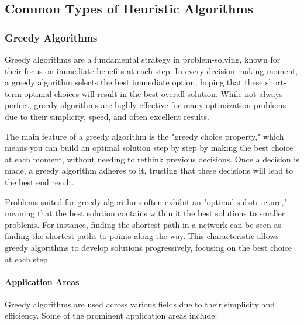 \documentclass[
]{article}
\begin{document}
    \hypertarget{common-types-of-heuristic-algorithms}{%

        \subsection{Common Types of Heuristic Algorithms}\label{itm:common-types-of-heuristic-algorithms}}

    \subsubsection{Greedy Algorithms}
    \label{subsubsec:greedy_algorithms}

    Greedy algorithms are a fundamental strategy in problem-solving, known for their focus on immediate benefits at each step. In every decision-making moment, a greedy algorithm selects the best immediate option, hoping that these short-term optimal choices will result in the best overall solution. While not always perfect, greedy algorithms are highly effective for many optimization problems due to their simplicity, speed, and often excellent results.

    The main feature of a greedy algorithm is the "greedy choice property," which means you can build an optimal solution step by step by making the best choice at each moment, without needing to rethink previous decisions. Once a decision is made, a greedy algorithm adheres to it, trusting that these decisions will lead to the best end result.

    Problems suited for greedy algorithms often exhibit an "optimal substructure," meaning that the best solution contains within it the best solutions to smaller problems. For instance, finding the shortest path in a network can be seen as finding the shortest paths to points along the way. This characteristic allows greedy algorithms to develop solutions progressively, focusing on the best choice at each step.

    \paragraph{Application Areas}

    Greedy algorithms are used across various fields due to their simplicity and efficiency. Some of the prominent application areas include:
\end{document}
